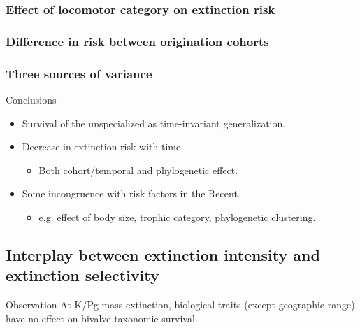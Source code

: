 \documentclass{beamer}
\begin{document}
\begin{frame}
  \frametitle{Effect of locomotor category on extinction risk}

\end{frame}

\begin{frame}
  \frametitle{Difference in risk between origination cohorts}

\end{frame}

\begin{frame}
  \frametitle{Three sources of variance}

\end{frame}

\begin{frame}
  \begin{block}{Conclusions}
    \begin{itemize}
      \item Survival of the unspecialized as time-invariant generalization.
      \item Decrease in extinction risk with time.
        \begin{itemize}
          \item Both cohort/temporal and phylogenetic effect.
        \end{itemize}
      \item Some incongruence with risk factors in the Recent.
        \begin{itemize}
          \item e.g. effect of body size, trophic category, phylogenetic clustering.
        \end{itemize}
    \end{itemize}
  \end{block}
\end{frame}



\subsection{Interplay between extinction intensity and extinction selectivity}

\begin{frame}
  \begin{alertblock}{Observation}
    At K/Pg mass extinction, biological traits (except geographic range) have no effect on \alert{bivalve} taxonomic survival.

  \end{alertblock}
\end{frame}
\end{document}
